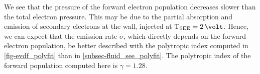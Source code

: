 We see that the pressure of the forward electron population decreases slower than the total electron pressure.
This may be due to the partial absorption and emission of secondary electrons at the wall, injected at $\Tsee=2\,\volt$.
Hence, we can expect that the emission rate $\sigma$, which directly depends on the forward electron population, be better described with the polytropic index computed in \cref{fig-evdf_polyfit} than in \cref{subsec-fluid_see_polyfit}.
The polytropic index of the forward population computed here is $\gamma=1.28$.

